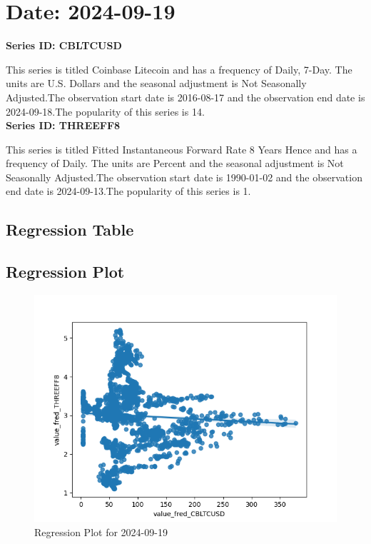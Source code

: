 \section{Date: 2024-09-19}
\noindent \textbf{Series ID: CBLTCUSD} 

\noindent This series is titled Coinbase Litecoin and has a frequency of Daily, 7-Day. The units are U.S. Dollars and the seasonal adjustment is Not Seasonally Adjusted.The observation start date is 2016-08-17 and the observation end date is 2024-09-18.The popularity of this series is 14. \\ 

\noindent \textbf{Series ID: THREEFF8} 

\noindent This series is titled Fitted Instantaneous Forward Rate 8 Years Hence and has a frequency of Daily. The units are Percent and the seasonal adjustment is Not Seasonally Adjusted.The observation start date is 1990-01-02 and the observation end date is 2024-09-13.The popularity of this series is 1. \\ 

\subsection{Regression Table}


\subsection{Regression Plot}
\begin{figure}
\centering
\includegraphics[scale = 0.9]{plots/plot_2024-09-19.png}
\caption{Regression Plot for 2024-09-19}
\end{figure}
\newpage
